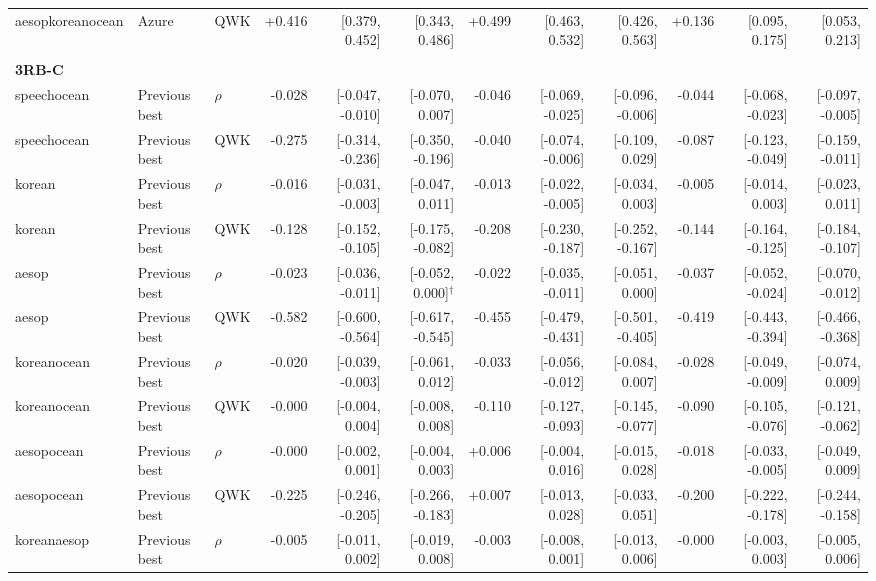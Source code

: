 \documentclass[10pt]{article}
\begin{document}
\begin{landscape}
\begin{longtable}{@{}lllrrrrrrrrr@{}}
aesopkoreanocean & Azure & QWK & +0.416 & [0.379, 0.452] & [0.343, 0.486] & +0.499 & [0.463, 0.532] & [0.426, 0.563] & +0.136 & [0.095, 0.175] & [0.053, 0.213]\\
\addlinespace[2pt]
\midrule\multicolumn{12}{l}{\textbf{Banded minus previous 1G-S/1G-AMAE/5G-AMAE metric leader}}\\*
\multicolumn{12}{l}{\textbf{3RB-C}}\\*
speechocean & Previous best & $\rho$ & -0.028 & [-0.047, -0.010] & [-0.070, 0.007] & -0.046 & [-0.069, -0.025] & [-0.096, -0.006] & -0.044 & [-0.068, -0.023] & [-0.097, -0.005]\\
speechocean & Previous best & QWK & -0.275 & [-0.314, -0.236] & [-0.350, -0.196] & -0.040 & [-0.074, -0.006] & [-0.109, 0.029] & -0.087 & [-0.123, -0.049] & [-0.159, -0.011]\\
korean & Previous best & $\rho$ & -0.016 & [-0.031, -0.003] & [-0.047, 0.011] & -0.013 & [-0.022, -0.005] & [-0.034, 0.003] & -0.005 & [-0.014, 0.003] & [-0.023, 0.011]\\
korean & Previous best & QWK & -0.128 & [-0.152, -0.105] & [-0.175, -0.082] & -0.208 & [-0.230, -0.187] & [-0.252, -0.167] & -0.144 & [-0.164, -0.125] & [-0.184, -0.107]\\
aesop & Previous best & $\rho$ & -0.023 & [-0.036, -0.011] & [-0.052, 0.000]$^{\dagger}$ & -0.022 & [-0.035, -0.011] & [-0.051, 0.000] & -0.037 & [-0.052, -0.024] & [-0.070, -0.012]\\
aesop & Previous best & QWK & -0.582 & [-0.600, -0.564] & [-0.617, -0.545] & -0.455 & [-0.479, -0.431] & [-0.501, -0.405] & -0.419 & [-0.443, -0.394] & [-0.466, -0.368]\\
koreanocean & Previous best & $\rho$ & -0.020 & [-0.039, -0.003] & [-0.061, 0.012] & -0.033 & [-0.056, -0.012] & [-0.084, 0.007] & -0.028 & [-0.049, -0.009] & [-0.074, 0.009]\\
koreanocean & Previous best & QWK & -0.000 & [-0.004, 0.004] & [-0.008, 0.008] & -0.110 & [-0.127, -0.093] & [-0.145, -0.077] & -0.090 & [-0.105, -0.076] & [-0.121, -0.062]\\
aesopocean & Previous best & $\rho$ & -0.000 & [-0.002, 0.001] & [-0.004, 0.003] & +0.006 & [-0.004, 0.016] & [-0.015, 0.028] & -0.018 & [-0.033, -0.005] & [-0.049, 0.009]\\
aesopocean & Previous best & QWK & -0.225 & [-0.246, -0.205] & [-0.266, -0.183] & +0.007 & [-0.013, 0.028] & [-0.033, 0.051] & -0.200 & [-0.222, -0.178] & [-0.244, -0.158]\\
koreanaesop & Previous best & $\rho$ & -0.005 & [-0.011, 0.002] & [-0.019, 0.008] & -0.003 & [-0.008, 0.001] & [-0.013, 0.006] & -0.000 & [-0.003, 0.003] & [-0.005, 0.006]\\

\end{longtable}
\end{landscape}
\end{document}
